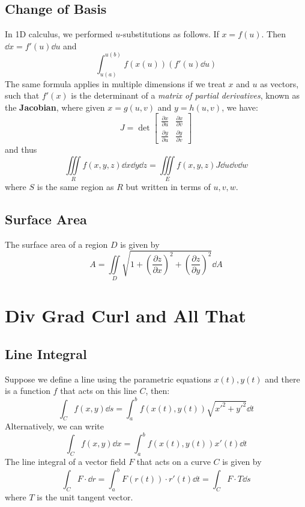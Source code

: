 \documentclass{article}
\begin{document}
\subsection{Change of Basis}
In 1D calculus, we performed $u$-substitutions as follows. If $x=f(u)$. Then $\dd{x} = f'(u) \dd{u}$ and
\begin{equation}
    \int_{u(a)}^{u(b)} f(x(u)) \left(f'(u)\dd{u}\right)
\end{equation}
The same formula applies in multiple dimensions if we treat $x$ and $u$ as vectors, such that $f'(x)$ is the determinant of a \textit{matrix of partial derivatives}, known as the \textbf{Jacobian}, where given $x=g(u,v)$ and $y=h(u,v)$, we have:
\begin{equation}
    J = 
    \det \begin{bmatrix}
        \frac{\partial x}{\partial u} & \frac{\partial x}{\partial v} \\ 
        \frac{\partial y}{\partial u} & \frac{\partial y}{\partial v}
    \end{bmatrix}
\end{equation}
and thus 
\begin{equation}
    \iiint\limits_{R} f(x,y,z) \dd{x}\dd{y}\dd{z} = \iiint\limits_{E} f(x,y,z) J \dd{u}\dd{v}\dd{w}
\end{equation}
where $S$ is the same region as $R$ but written in terms of $u,v,w$.
\subsection{Surface Area}
The surface area of a region $D$ is given by
\begin{equation}
    A = \iint\limits_{D} \sqrt{1+\left(\frac{\partial z}{\partial x}\right)^2+\left(\frac{\partial z}{\partial y}\right)^2} \dd{A}
\end{equation}
\section{Div Grad Curl and All That}
\subsection{Line Integral}
Suppose we define a line using the parametric equations $x(t),y(t)$ and there is a function $f$ that acts on this line $C$, then:
\begin{equation}
    \int_C f(x,y) \dd{s} = \int_a^b f(x(t),y(t)) \sqrt{x'^2+y'^2}\dd{t}
\end{equation}
Alternatively, we can write
\begin{equation}
    \int_C f(x,y)\dd{x} = \int_a^b f(x(t),y(t))x'(t) \dd{t}
\end{equation}
The line integral of a vector field $F$ that acts on a curve $C$ is given by
\begin{equation}
    \int_C F \cdot \dd{r} = \int_a^b F(r(t))\cdot r'(t) \dd{t} = \int_C F \cdot T \dd{s}
\end{equation}
where $T$ is the unit tangent vector.
\end{document}
